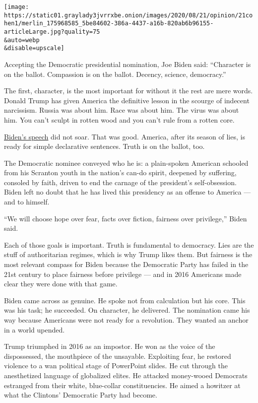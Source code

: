 \texttt{[image: https://static01.graylady3jvrrxbe.onion/images/2020/08/21/opinion/21cohen1/merlin\_175968585\_5be84602-386a-4437-a16b-820ab6b96155-articleLarge.jpg?quality=75\\\&auto=webp\\\&disable=upscale]}

Accepting the Democratic presidential nomination, Joe Biden said:
``Character is on the ballot. Compassion is on the ballot. Decency,
science, democracy.''

The first, character, is the most important for without it the rest are
mere words. Donald Trump has given America the definitive lesson in the
scourge of indecent narcissism. Russia was about him. Race was about
him. The virus was about him. You can't sculpt in rotten wood and you
can't rule from a rotten core.

\href{https://www.nytimes3xbfgragh.onion/2020/08/20/us/politics/biden-presidential-nomination-dnc.html}{Biden's
speech} did not soar. That was good. America, after its season of lies,
is ready for simple declarative sentences. Truth is on the ballot, too.

The Democratic nominee conveyed who he is: a plain-spoken American
schooled from his Scranton youth in the nation's can-do spirit, deepened
by suffering, consoled by faith, driven to end the carnage of the
president's self-obsession. Biden left no doubt that he has lived this
presidency as an offense to America --- and to himself.

``We will choose hope over fear, facts over fiction, fairness over
privilege,'' Biden said.

Each of those goals is important. Truth is fundamental to democracy.
Lies are the stuff of authoritarian regimes, which is why Trump likes
them. But fairness is the most relevant compass for Biden because the
Democratic Party has failed in the 21st century to place fairness before
privilege --- and in 2016 Americans made clear they were done with that
game.

Biden came across as genuine. He spoke not from calculation but his
core. This was his task; he succeeded. On character, he delivered. The
nomination came his way because Americans were not ready for a
revolution. They wanted an anchor in a world upended.

Trump triumphed in 2016 as an impostor. He won as the voice of the
dispossessed, the mouthpiece of the unsayable. Exploiting fear, he
restored violence to a wan political stage of PowerPoint slides. He cut
through the anesthetized language of globalized elites. He attacked
money-wooed Democrats estranged from their white, blue-collar
constituencies. He aimed a howitzer at what the Clintons' Democratic
Party had become.

